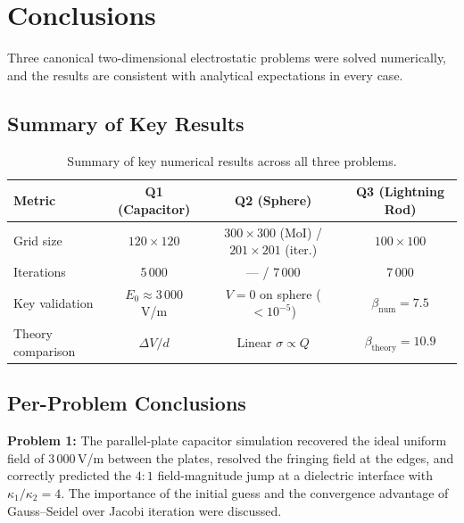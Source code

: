 \documentclass[11pt,a4paper]{article}
\begin{document}
\newpage

\section{Conclusions}

Three canonical two-dimensional electrostatic problems were solved numerically, and the results are consistent with analytical expectations in every case.

\subsection{Summary of Key Results}

\begin{table}[H]
\centering
\small
\renewcommand{\arraystretch}{1.3}
\begin{tabular}{lccc}
\toprule
\textbf{Metric} & \textbf{Q1 (Capacitor)} & \textbf{Q2 (Sphere)} & \textbf{Q3 (Lightning Rod)} \\
\midrule
Grid size          & $120 \times 120$ & $300 \times 300$ (MoI) / $201 \times 201$ (iter.) & $100 \times 100$ \\
Iterations         & 5\,000 & --- / 7\,000 & 7\,000 \\
Key validation     & $E_0 \approx 3\,000$ V/m & $V=0$ on sphere ($<10^{-5}$) & $\beta_{\text{num}} = 7.5$ \\
Theory comparison  & $\Delta V / d$ & Linear $\sigma \propto Q$ & $\beta_{\text{theory}} = 10.9$ \\
\bottomrule
\end{tabular}
\caption{Summary of key numerical results across all three problems.}
\end{table}

\subsection{Per-Problem Conclusions}

\textbf{Problem 1:} The parallel-plate capacitor simulation recovered the ideal uniform field of 3\,000\,V/m between the plates, resolved the fringing field at the edges, and correctly predicted the $4{:}1$ field-magnitude jump at a dielectric interface with $\kappa_1/\kappa_2 = 4$. The importance of the initial guess and the convergence advantage of Gauss--Seidel over Jacobi iteration were discussed.
\end{document}

